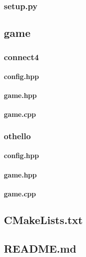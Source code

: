 \documentclass[12pt]{article}
\newcommand{\incFile}[2]{\label{code:#2}\newpage}
\begin{document}
\subsubsection{setup.py}												\incFile{python}{elo/setup.py}

\subsection{game}															%
\subsubsection{connect4}
\paragraph{config.hpp}													\incFile{C++}{games/connect4/config.hpp}
\paragraph{game.hpp}													\incFile{C++}{games/connect4/game.hpp}
\paragraph{game.cpp}													\incFile{C++}{games/connect4/game.cpp}

\subsubsection{othello}													%
\paragraph{config.hpp}													\incFile{C++}{games/othello/config.hpp}
\paragraph{game.hpp}													\incFile{C++}{games/othello/game.hpp}
\paragraph{game.cpp}													\incFile{C++}{games/othello/game.cpp}

\subsection{CMakeLists.txt}											\incFile{python}{CMakeLists.txt}
\subsection{README.md}												\incFile{python}{README.md}
\end{document}
